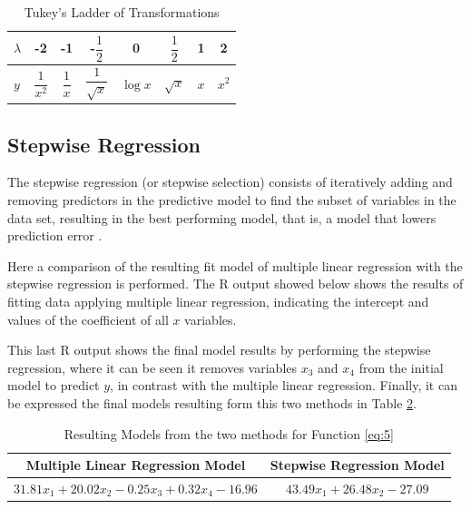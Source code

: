\documentclass[10pt,leter,openany]{article}
\begin{document}
		\begin{table}[]
			\centering
			\caption{Tukey's Ladder of Transformations}
			\label{tab:ladders}
			\begin{tabular}{@{}|l|ccccccc|@{}}
				\toprule
				\textbf{$\lambda$} & -2                & -1            & -$\dfrac{1}{2}$      & 0       & $\dfrac{1}{2}$ & 1   & 2       \\ \midrule
				\textbf{$y$}       & $\dfrac{1}{x^{2}}$ & $\dfrac{1}{x}$ & $\dfrac{1}{\sqrt{x}}$ & $\log x$ & $\sqrt{x}$     & $x$ & $x^{2}$ \\ \bottomrule
			\end{tabular}
		\end{table}

	\subsection{Stepwise Regression}

		The stepwise regression (or stepwise selection) consists of iteratively adding and removing predictors in the predictive model to find the subset of variables in the data set, resulting in the best performing model, that is, a model that lowers prediction error \citep{kassambara2018stepwise}. 
		
		Here a comparison of the resulting fit model of multiple linear regression with the stepwise regression is performed. The R output showed below shows the results of fitting data applying multiple linear regression, indicating the intercept and values of the coefficient of all $x$ variables.
		

		This last R output shows the final model results by performing the stepwise regression, where it can be seen it removes variables $x_{3} $ and $ x_{4} $ from the initial model to predict $y$, in contrast with the multiple linear regression. Finally, it can be expressed the final models resulting form this two methods in Table \ref{tab:models}.
		
		
		
			
		\begin{table}[]
			\centering
			\caption{Resulting Models from the two methods for Function \ref{eq:5}}
			\label{tab:models}
			\begin{tabular}{@{}cc@{}}
				\toprule
				\textbf{Multiple Linear Regression Model} & \textbf{Stepwise Regression Model} \\ \midrule
				    $31.81x_{1 }   + 20.02x_{2} - 0.25x_{3}    + 0.32x_{4 } - 16.96$    &           $43.49 x_{1}  + 26.48x_{2} - 27.09$ \\  \bottomrule
			\end{tabular}
		\end{table}
		
\clearpage

	
	
	
\end{document}
